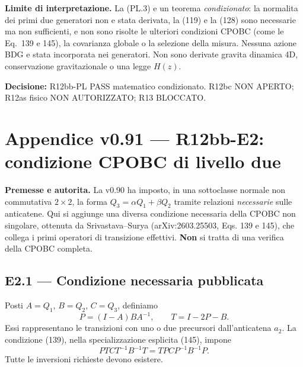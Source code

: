 \documentclass[11pt,a4paper]{article}
\begin{document}
\textbf{Limite di interpretazione.} La (PL.3) e un teorema \emph{condizionato}: la normalita dei primi due generatori non e stata derivata, la (119) e la (128) sono necessarie ma non sufficienti, e non sono risolte le ulteriori condizioni CPOBC (come le Eq.~139 e 145), la covarianza globale o la selezione della misura. Nessuna azione BDG e stata incorporata nei generatori. Non sono derivate gravita dinamica 4D, conservazione gravitazionale o una legge $H(z)$.

\textbf{Decisione:} \textsf{R12bb-PL PASS matematico condizionato. R12bc NON APERTO; R12as fisico NON AUTORIZZATO; R13 BLOCCATO.}

\clearpage
\section*{Appendice v0.91 --- R12bb-E2: condizione CPOBC di livello due}
\textbf{Premesse e autorita.} La v0.90 ha imposto, in una sottoclasse normale non commutativa $2\times2$, la forma $Q_3=\alpha Q_1+\beta Q_2$ tramite relazioni \emph{necessarie} sulle anticatene. Qui si aggiunge una diversa condizione necessaria della CPOBC non singolare, ottenuta da Srivastava--Surya (arXiv:2603.25503, Eqs. 139 e 145), che collega i primi operatori di transizione effettivi. \textbf{Non} si tratta di una verifica della CPOBC completa.

\subsection*{E2.1 --- Condizione necessaria pubblicata}
Posti $A=Q_1$, $B=Q_2$, $C=Q_3$, definiamo
\begin{equation}
 P=(I-A)BA^{-1},\qquad T=I-2P-B.\tag{E2.1}
\end{equation}
Essi rappresentano le transizioni con uno o due precursori dall'anticatena $a_2$. La condizione (139), nella specializzazione esplicita (145), impone
\begin{equation}
 PTCT^{-1}B^{-1}T=TP CP^{-1}B^{-1}P.\tag{E2.2}
\end{equation}
Tutte le inversioni richieste devono esistere.
\end{document}
